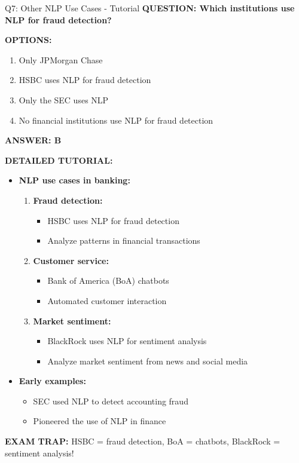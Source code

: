 \documentclass[8pt]{beamer}
\begin{document}
	\begin{frame}{Q7: Other NLP Use Cases - Tutorial}
		\fontsize{6.5}{7.5}\selectfont
		\textbf{QUESTION: Which institutions use NLP for fraud detection?}
		
		\vspace{0.1cm}
		\textbf{OPTIONS:}
		\begin{enumerate}
			\item Only JPMorgan Chase
			\item HSBC uses NLP for fraud detection
			\item Only the SEC uses NLP
			\item No financial institutions use NLP for fraud detection
		\end{enumerate}
		
		\vspace{0.1cm}
		\textcolor{myblue}{\textbf{ANSWER: B}}
		
		\vspace{0.1cm}
		\textbf{DETAILED TUTORIAL:}
		\begin{itemize}
			\item \textbf{NLP use cases in banking:}
			\begin{enumerate}
				\item \textbf{Fraud detection:}
				\begin{itemize}
					\item HSBC uses NLP for fraud detection
					\item Analyze patterns in financial transactions
				\end{itemize}
				\item \textbf{Customer service:}
				\begin{itemize}
					\item Bank of America (BoA) chatbots
					\item Automated customer interaction
				\end{itemize}
				\item \textbf{Market sentiment:}
				\begin{itemize}
					\item BlackRock uses NLP for sentiment analysis
					\item Analyze market sentiment from news and social media
				\end{itemize}
			\end{enumerate}
			\item \textbf{Early examples:}
			\begin{itemize}
				\item SEC used NLP to detect accounting fraud
				\item Pioneered the use of NLP in finance
			\end{itemize}
		\end{itemize}
		
		\textcolor{myred}{\textbf{EXAM TRAP:}} HSBC = \textcolor{myblue}{fraud detection}, BoA = \textcolor{myblue}{chatbots}, BlackRock = \textcolor{myblue}{sentiment analysis}!
	\end{frame}
	
\end{document}
